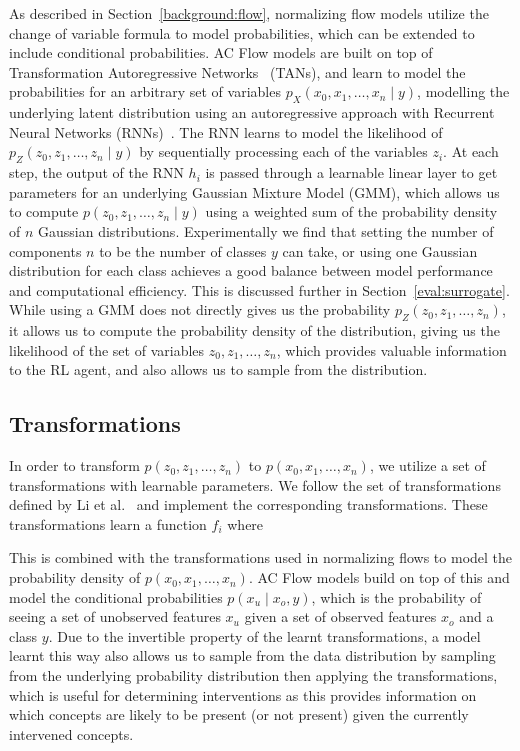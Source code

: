\documentclass[../main.tex]{subfiles}
\begin{document}
As described in Section~\ref{background:flow}, 
normalizing flow models utilize the change of variable formula to model probabilities,
which can be extended to include conditional probabilities. AC Flow models are built on top of
Transformation Autoregressive
Networks~\cite{tans} (TANs), and learn to model 
the probabilities for an arbitrary set of variables $p_X(x_0, x_1, \ldots, x_n \mid y)$,
modelling the underlying latent distribution using an autoregressive approach with Recurrent
Neural Networks (RNNs)~\cite{rnn}. The RNN learns to model the likelihood of 
$p_Z(z_0, z_1, \ldots, z_n \mid y)$ by sequentially processing each of the variables $z_i$.
At each step, the output of the RNN $h_i$ is 
passed through a learnable linear layer to get parameters for an underlying Gaussian Mixture Model (GMM),
which allows us to compute $p(z_0, z_1, \ldots, z_n \mid y)$ using a weighted
sum of the probability density of $n$ Gaussian distributions. Experimentally
we find that setting the number of components $n$ to be the number of classes 
$y$ can take, or using one Gaussian distribution for each class 
achieves
a good balance between model performance and computational efficiency.
This is discussed further in Section~\ref{eval:surrogate}.
While using a GMM does not directly gives us the probability
$p_Z(z_0, z_1, \ldots, z_n)$, it allows us to compute the probability density of the distribution, giving 
us the likelihood of the set of variables $z_0, z_1, \ldots, z_n$, which provides valuable information
to the RL agent, and also allows us to sample from the distribution.

\subsection{Transformations}

In order to transform $p(z_0, z_1, \ldots, z_n)$ to $p(x_0, x_1, \ldots, x_n)$, we
utilize a set of transformations with learnable parameters. We follow the 
set of transformations defined by Li et al.~\cite{acflow} and implement the corresponding
transformations. These transformations learn a function $f_i$ where

This is combined with the transformations used in normalizing flows to 
model the probability density of $p(x_0, x_1, \ldots, x_n)$. AC Flow models
build on top of this and model the conditional probabilities $p(x_u \mid x_o, y)$, which is the probability of 
seeing a set of unobserved features $x_u$
given a set of observed features $x_o$ and a class $y$. 
Due to the invertible property of the learnt transformations,
a model learnt this way also allows us to sample from the data distribution
by sampling from the underlying probability distribution then applying the transformations, which is useful for
determining interventions as
this provides information on which concepts are likely to be present (or not present) given the currently intervened
concepts.
\end{document}
